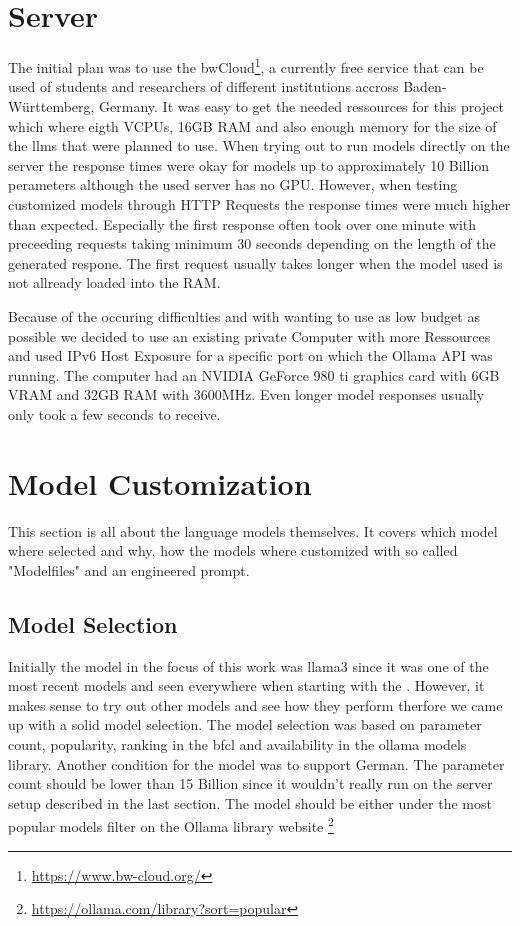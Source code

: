 \section{Server}
The initial plan was to use the bwCloud\footnote{\url{https://www.bw-cloud.org/}}, a currently free service that can be used of students and researchers of different institutions accross Baden-Württemberg, Germany.
It was easy to get the needed ressources for this project which where eigth VCPUs, 16GB RAM and also enough memory for the size of the \glspl{llm} that were planned to use.
When trying out to run models directly on the server the response times were okay for models up to approximately 10 Billion perameters although the used server has no GPU.
However, when testing customized models through HTTP Requests the response times were much higher than expected.
Especially the first response often took over one minute with preceeding requests taking minimum 30 seconds depending on the length of the generated respone.
The first request usually takes longer when the model used is not allready loaded into the RAM.

Because of the occuring difficulties and with wanting to use as low budget as possible we decided to use an existing private Computer with more Ressources and used IPv6 Host Exposure for a specific port on which the Ollama API was running.
The computer had an NVIDIA GeForce 980 ti graphics card with 6GB VRAM and 32GB RAM with 3600MHz.
Even longer model responses usually only took a few seconds to receive.

\section{Model Customization}
This section is all about the language models themselves. It covers which model where selected and why, how the models where customized with so called "Modelfiles" and an engineered prompt.
\subsection{Model Selection}
Initially the model in the focus of this work was llama3 since it was one of the most recent models and seen everywhere when starting with the .
However, it makes sense to try out other models and see how they perform therfore we came up with a solid model selection.
The model selection was based on parameter count, popularity, ranking in the \gls{bfcl} and availability in the ollama models library.
Another condition for the model was to support German.
The parameter count should be lower than 15 Billion since it wouldn't really run on the server setup described in the last section.
The model should be either under the most popular models filter on the Ollama library website \footnote{\url{https://ollama.com/library?sort=popular}}

